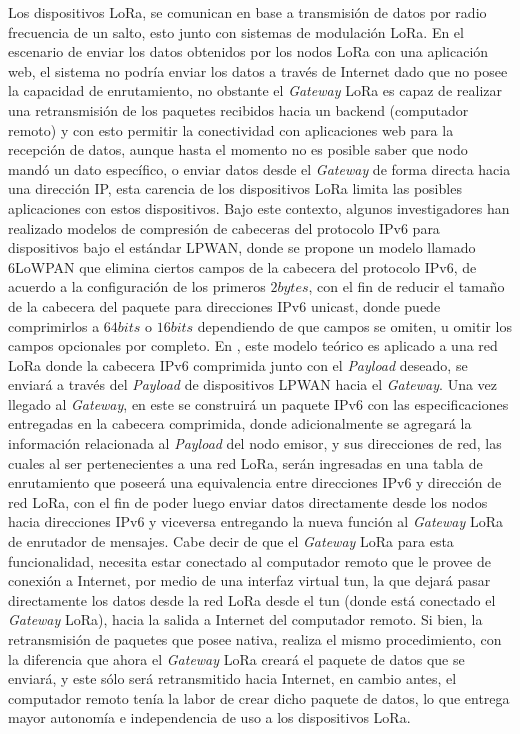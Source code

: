 \begin{justify}
Los dispositivos LoRa, se comunican en base a transmisión de datos por radio frecuencia de un salto, esto junto con sistemas de modulación LoRa. En el escenario de enviar los datos obtenidos por los nodos LoRa con una aplicación web, el sistema no podría enviar los datos a través de Internet dado que no posee la capacidad de enrutamiento, no obstante el \textit{Gateway} LoRa es capaz de realizar una retransmisión de los paquetes recibidos hacia un backend (computador remoto) y con esto permitir la conectividad con aplicaciones web para la recepción de datos, aunque hasta el momento no es posible saber que nodo mandó un dato específico, o enviar datos desde el \textit{Gateway} de forma directa hacia una dirección IP, esta carencia de los dispositivos LoRa limita las posibles aplicaciones con estos dispositivos. Bajo este contexto, algunos investigadores \cite{lowpan} han realizado modelos de compresión de cabeceras del protocolo IPv6 para dispositivos bajo el estándar LPWAN, donde se propone un modelo llamado 6LoWPAN que elimina ciertos campos de la cabecera del protocolo IPv6, de acuerdo a la configuración de los primeros $2bytes$, con el fin de reducir el tamaño de la cabecera del paquete para direcciones IPv6 unicast, donde puede comprimirlos a $64 bits$ o $16 bits$ dependiendo de que campos se omiten, u omitir los campos opcionales por completo. En \cite{tomas}, este modelo teórico es aplicado a una red LoRa donde la cabecera IPv6 comprimida junto con el \textit{Payload} deseado, se enviará a través del \textit{Payload} de dispositivos LPWAN hacia el \textit{Gateway}. Una vez llegado al \textit{Gateway}, en este se construirá un paquete IPv6 con las especificaciones entregadas en la cabecera comprimida, donde adicionalmente se agregará la información relacionada al \textit{Payload} del nodo emisor, y sus direcciones de red, las cuales al ser pertenecientes a una red LoRa, serán ingresadas en una tabla de enrutamiento que poseerá una equivalencia entre direcciones IPv6 y dirección de red LoRa, con el fin de poder luego enviar datos directamente desde los nodos hacia direcciones IPv6 y viceversa entregando la nueva función al \textit{Gateway} LoRa de enrutador de mensajes.\newpage
\noindent
Cabe decir de que el \textit{Gateway} LoRa para esta funcionalidad, necesita estar conectado al computador remoto que le provee de conexión a Internet, por medio de una interfaz virtual \gls{tun}, la que dejará pasar directamente los datos desde la red LoRa desde el \gls{tun} (donde está conectado el \textit{Gateway} LoRa), hacia la salida a Internet del computador remoto. Si bien, la retransmisión de paquetes que posee nativa, realiza el mismo procedimiento, con la diferencia que ahora el \textit{Gateway} LoRa creará el paquete de datos que se enviará, y este sólo será retransmitido hacia Internet, en cambio antes, el computador remoto tenía la labor de crear dicho paquete de datos, lo que entrega mayor autonomía e independencia de uso a los dispositivos LoRa.\\

\end{justify}
